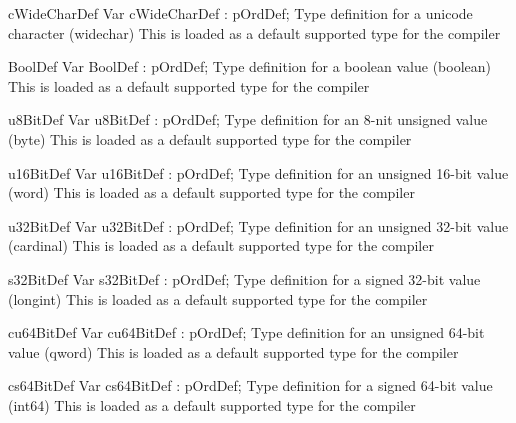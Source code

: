 \documentclass [a4paper,12pt]{article}
\begin{document}
\begin{variable}{cWideCharDef}
\Declaration
Var cWideCharDef : pOrdDef;
\Description
Type definition for a unicode character (\textsf{widechar})
\Notes
This is loaded as a default supported type for the compiler
\end{variable}

\begin{variable}{BoolDef}
\Declaration
Var BoolDef : pOrdDef;
\Description
Type definition for a boolean value (\textsf{boolean})
\Notes
This is loaded as a default supported type for the compiler
\end{variable}

\begin{variable}{u8BitDef}
\Declaration
Var u8BitDef : pOrdDef;
\Description
Type definition for an 8-nit unsigned value (\textsf{byte})
\Notes
This is loaded as a default supported type for the compiler
\end{variable}

\begin{variable}{u16BitDef}
\Declaration
Var u16BitDef : pOrdDef;
\Description
Type definition for an unsigned 16-bit value (\textsf{word})
\Notes
This is loaded as a default supported type for the compiler
\end{variable}

\begin{variable}{u32BitDef}
\Declaration
Var u32BitDef : pOrdDef;
\Description
Type definition for an unsigned 32-bit value (\textsf{cardinal})
\Notes
This is loaded as a default supported type for the compiler
\end{variable}

\begin{variable}{s32BitDef}
\Declaration
Var s32BitDef : pOrdDef;
\Description
Type definition for a signed 32-bit value (\textsf{longint})
\Notes
This is loaded as a default supported type for the compiler
\end{variable}

\begin{variable}{cu64BitDef}
\Declaration
Var cu64BitDef : pOrdDef;
\Description
Type definition for an unsigned 64-bit value (\textsf{qword})
\Notes
This is loaded as a default supported type for the compiler
\end{variable}

\begin{variable}{cs64BitDef}
\Declaration
Var cs64BitDef : pOrdDef;
\Description
Type definition for a signed 64-bit value (\textsf{int64})
\Notes
This is loaded as a default supported type for the compiler
\end{variable}
\end{document}
